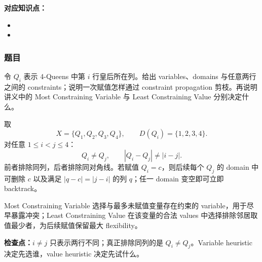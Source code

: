 \textbf{对应知识点：}
\begin{itemize}
  \item {}
  \item {}
\end{itemize}

\subsubsection*{题目}

令 $Q_i$ 表示 4-Queens 中第 $i$ 行皇后所在列。给出 variables、domains 与任意两行之间的 constraints；说明一次赋值怎样通过 constraint propagation 剪枝。再说明讲义中的 Most Constraining Variable 与 Least Constraining Value 分别决定什么。

\begin{checkedsolution}
取
\[
  X=\{Q_1,Q_2,Q_3,Q_4\},
  \qquad D(Q_i)=\{1,2,3,4\}.
\]
对任意 $1\le i<j\le4$：
\[
  Q_i\ne Q_j,
  \qquad |Q_i-Q_j|\ne |i-j|.
\]
前者排除同列，后者排除同对角线。若赋值 $Q_i=c$，则后续每个 $Q_j$ 的 domain 中可删除 $c$ 以及满足 $|q-c|=|j-i|$ 的列 $q$；任一 domain 变空即可立即 backtrack。

Most Constraining Variable 选择与最多未赋值变量存在约束的 variable，用于尽早暴露冲突；Least Constraining Value 在该变量的合法 values 中选择排除邻居取值最少者，为后续赋值保留最大 flexibility。
\end{checkedsolution}

\textbf{检查点：}$i\ne j$ 只表示两行不同；真正排除同列的是 $Q_i\ne Q_j$。Variable heuristic 决定先选谁，value heuristic 决定先试什么。
